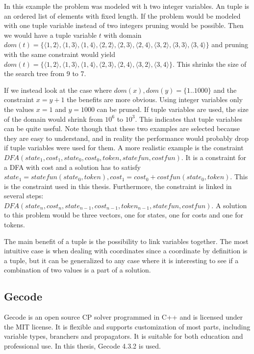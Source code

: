 \documentclass[a4paper,11pt]{article}
\begin{document}
In this example the problem was modeled wit h two integer variables. An tuple is an ordered list of elements with fixed length. If the problem would be modeled with one tuple variable instead of two integers pruning would be possible. Then we would have a tuple variable $t$ with domain $dom(t)=\{\langle1,2\rangle,\langle1,3\rangle,\langle1,4\rangle,\langle2,2\rangle,\langle2,3\rangle,\langle2,4\rangle,\langle3,2\rangle,\langle3,3\rangle,\langle3,4\rangle\}$ and pruning with the same constraint would yield $dom(t)=\{\langle1,2\rangle,\langle1,3\rangle,\langle1,4\rangle,\langle2,3\rangle,\langle2,4\rangle,\langle3,2\rangle,\langle3,4\rangle\}$. This shrinks the size of the search tree from 9 to 7. 

If we instead look at the case where $dom(x),dom(y)=\{1..1000\}$ and the constraint $x=y+1$ the benefits are more obvious. Using integer variables only the values $x=1$ and $y=1000$ can be pruned. If tuple variables are used, the size of the domain would shrink from $10^6$ to $10^3$. This indicates that tuple variables can be quite useful. Note though that these two examples are selected because they are easy to understand, and in reality the performance would probably drop if tuple variables were used for them. A more realistic example is the constraint $DFA(state_1, cost_1, state_0, cost_0, token, statefun, costfun)$. It is a constraint for a DFA with cost and a solution has to satisfy $state_1= statefun(state_0, token), cost_1=cost_0+costfun(state_0, token)$. This is the constraint used in this thesis. Furthermore, the constraint is linked in several steps: $DFA(state_n, cost_n, state_{n-1}, cost_{n-1}, token_{n-1}, statefun, costfun)$. A solution to this problem would be three vectors, one for states, one for costs and one for tokens.

The main benefit of a tuple is the possibility to link variables together. The most intuitive case is when dealing with coordinates since a coordinate by definition is a tuple, but it can be generalized to any case where it is interesting to see if a combination of two values is a part of a solution. 

\subsection{Gecode}
Gecode is an open source CP solver programmed in C++ and is licensed under the MIT license. It is flexible and supports customization of most parts, including variable types, branchers and propagators. It is suitable for both education and professional use. In this thesis, Gecode 4.3.2 is used.
\end{document}
